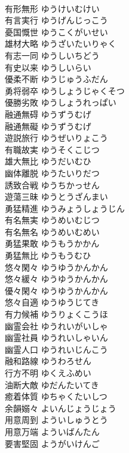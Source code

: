 \documentclass[8pt]{extreport}
\begin{document}
\begin{CJK}{UTF8}{min}
\\	有形無形	ゆうけいむけい	
\\	有言実行	ゆうげんじっこう	
\\	憂国慨世	ゆうこくがいせい	
\\	雄材大略	ゆうざいたいりゃく	
\\	有志一同	ゆうしいちどう	
\\	有史以来	ゆうしいらい	
\\	優柔不断	ゆうじゅうふだん	
\\	勇将弱卒	ゆうしょうじゃくそつ	
\\	優勝劣敗	ゆうしょうれっぱい	
\\	融通無碍	ゆうずうむげ	
\\	融通無礙	ゆうずうむげ	
\\	遊説旅行	ゆうぜいりょこう	
\\	有職故実	ゆうそくこじつ	
\\	雄大無比	ゆうだいむひ	
\\	幽体離脱	ゆうたいりだつ	
\\	誘致合戦	ゆうちかっせん	
\\	遊蕩三昧	ゆうとうざんまい	
\\	勇猛精進	ゆうみょうしょうじん	
\\	有名無実	ゆうめいむじつ	
\\	有名無名	ゆうめいむめい	
\\	勇猛果敢	ゆうもうかかん	
\\	勇猛無比	ゆうもうむひ	
\\	悠々閑々	ゆうゆうかんかん	
\\	悠々緩々	ゆうゆうかんかん	
\\	優々閑々	ゆうゆうかんかん	
\\	悠々自適	ゆうゆうじてき	
\\	有力候補	ゆうりょくこうほ	
\\	幽霊会社	ゆうれいがいしゃ	
\\	幽霊社員	ゆうれいしゃいん	
\\	幽霊人口	ゆうれいじんこう	
\\	融和路線	ゆうわろせん	
\\	行方不明	ゆくえふめい	
\\	油断大敵	ゆだんたいてき	
\\	癒着体質	ゆちゃくたいしつ	
\\	余韻嫋々	よいんじょうじょう	
\\	用意周到	よういしゅうとう	
\\	用意万端	よういばんたん	
\\	要害堅固	ようがいけんご	

\end{CJK}
\end{document}

